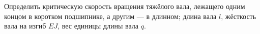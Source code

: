 Определить критическую скорость вращения тяжёлого вала,
лежащего одним концом в коротком подшипнике, а другим --- в длинном;
длина вала $l$, жёсткость вала на изгиб $EJ$, вес единицы длины вала $q$.
